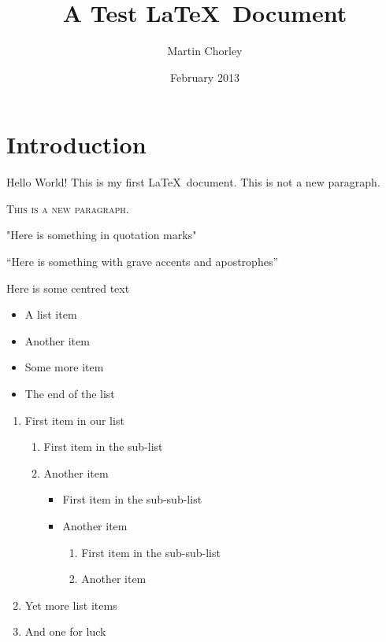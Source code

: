 \documentclass[12pt,twoside,a4paper]{article}
\title{A Test \LaTeX\ Document}
\author{Martin Chorley}
\date{February 2013}
\begin{document}
\maketitle

\begin{abstract}
\lipsum[2]
\end{abstract}

\section*{Introduction}
\onehalfspacing
{\Huge Hello World!} This is       my       first       \LaTeX\     document.
This is not a new paragraph.

\textsc{This is a new paragraph.}

"Here is something in quotation marks"

``Here is something with grave accents and apostrophes''

\begin{center}{\tiny Here is some centred text}\end{center}

\begin{itemize}
	\item A list item
	\item Another item
	\item Some more item
	\item The end of the list
\end{itemize}

\begin{enumerate}
	\item First item in our list
		\begin{enumerate}
			\item First item in the sub-list
			\item Another item
					\begin{itemize}
						\item First item in the sub-sub-list
						\item Another item
							\begin{enumerate}
								\item First item in the sub-sub-list
								\item Another item
							\end{enumerate}
					\end{itemize}
		\end{enumerate}
	\item Yet more list items
	\item And one for luck
\end{enumerate}
\end{document}
